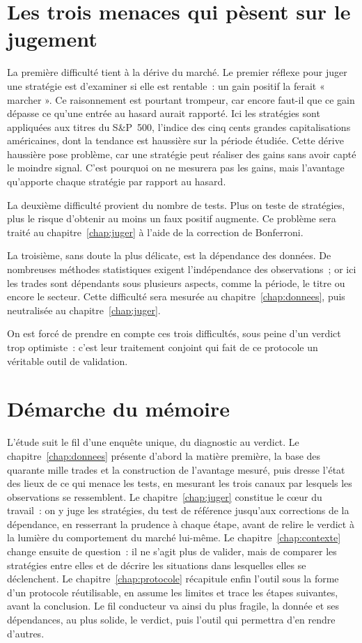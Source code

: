 \section{Les trois menaces qui pèsent sur le jugement}
\label{sec:menaces}

La première difficulté tient à la dérive du marché. Le premier réflexe
pour juger une stratégie est d'examiner si elle est rentable~: un gain
positif la ferait « marcher ». Ce raisonnement est pourtant trompeur,
car encore faut-il que ce gain dépasse ce qu'une entrée au hasard aurait
rapporté. Ici les stratégies sont appliquées aux titres du S\&P~500,
l'indice des cinq cents grandes capitalisations américaines, dont la
tendance est haussière sur la période étudiée. Cette dérive haussière
pose problème, car une stratégie peut réaliser des gains sans avoir
capté le moindre signal. C'est pourquoi on ne mesurera pas les gains,
mais l'avantage qu'apporte chaque stratégie par rapport au hasard.

La deuxième difficulté provient du nombre de tests. Plus on teste de
stratégies, plus le risque d'obtenir au moins un faux positif augmente.
Ce problème sera traité au chapitre~\ref{chap:juger} à l'aide de la
correction de Bonferroni.

La troisième, sans doute la plus délicate, est la dépendance des
données. De nombreuses méthodes statistiques exigent l'indépendance des
observations~; or ici les trades sont dépendants sous plusieurs aspects,
comme la période, le titre ou encore le secteur. Cette difficulté sera
mesurée au chapitre~\ref{chap:donnees}, puis neutralisée au
chapitre~\ref{chap:juger}.

On est forcé de prendre en compte ces trois difficultés, sous peine d'un
verdict trop optimiste~: c'est leur traitement conjoint qui fait de ce
protocole un véritable outil de validation.

\section{Démarche du mémoire}
\label{sec:planification}

L'étude suit le fil d'une enquête unique, du diagnostic au verdict. Le
chapitre~\ref{chap:donnees} présente d'abord la matière première, la
base des quarante mille trades et la construction de l'avantage mesuré,
puis dresse l'état des lieux de ce qui menace les tests, en mesurant les
trois canaux par lesquels les observations se ressemblent. Le
chapitre~\ref{chap:juger} constitue le c\oe ur du travail~: on y juge
les stratégies, du test de référence jusqu'aux corrections de la
dépendance, en resserrant la prudence à chaque étape, avant de relire le
verdict à la lumière du comportement du marché lui-même. Le
chapitre~\ref{chap:contexte} change ensuite de question~: il ne s'agit
plus de valider, mais de comparer les stratégies entre elles et de
décrire les situations dans lesquelles elles se déclenchent. Le
chapitre~\ref{chap:protocole} récapitule enfin l'outil sous la forme
d'un protocole réutilisable, en assume les limites et trace les étapes
suivantes, avant la conclusion. Le fil conducteur va ainsi du plus
fragile, la donnée et ses dépendances, au plus solide, le verdict, puis
l'outil qui permettra d'en rendre d'autres.
